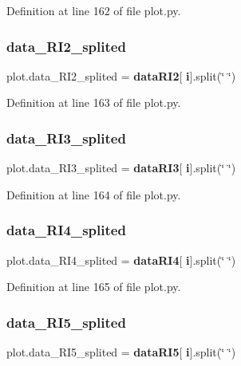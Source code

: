 Definition at line 162 of file plot.\+py.

\mbox{\label{namespaceplot_ae269461961f17ed3a022e9c60a48a77d}} 
\subsubsection{data\+\_\+\+R\+I2\+\_\+splited}
{\footnotesize\ttfamily plot.\+data\+\_\+\+R\+I2\+\_\+splited = \textbf{ data\+R\+I2}[\textbf{ i}].split(\char`\"{} \char`\"{})}



Definition at line 163 of file plot.\+py.

\mbox{\label{namespaceplot_a8ab01058d8be02f6d358af537966e170}} 
\subsubsection{data\+\_\+\+R\+I3\+\_\+splited}
{\footnotesize\ttfamily plot.\+data\+\_\+\+R\+I3\+\_\+splited = \textbf{ data\+R\+I3}[\textbf{ i}].split(\char`\"{} \char`\"{})}



Definition at line 164 of file plot.\+py.

\mbox{\label{namespaceplot_a1f9592c3f117346728ddce80576da66d}} 
\subsubsection{data\+\_\+\+R\+I4\+\_\+splited}
{\footnotesize\ttfamily plot.\+data\+\_\+\+R\+I4\+\_\+splited = \textbf{ data\+R\+I4}[\textbf{ i}].split(\char`\"{} \char`\"{})}



Definition at line 165 of file plot.\+py.

\mbox{\label{namespaceplot_a279992d4bddc76eae72a413cf2d83616}} 
\subsubsection{data\+\_\+\+R\+I5\+\_\+splited}
{\footnotesize\ttfamily plot.\+data\+\_\+\+R\+I5\+\_\+splited = \textbf{ data\+R\+I5}[\textbf{ i}].split(\char`\"{} \char`\"{})}



